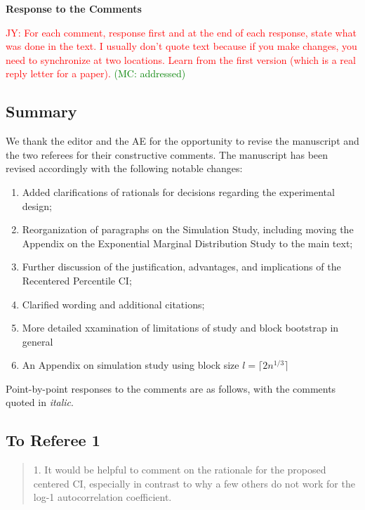 \documentclass[12pt]{article}
\newcommand{\jy}[1]{\textcolor{red}{JY: #1}}
\newcommand{\mc}[1]{\textcolor{green}{(MC: #1)}}
\newenvironment{comment}%
{\begin{quotation}\noindent\small\it\color{darkblue}\ignorespaces%
}{\end{quotation}}
\begin{document}
\begin{center}
  {\Large\bf Response to the Comments}
\end{center}



\jy{For each comment, response first and at the end of each response,
  state what was done in the text. I usually don't quote text because
  if you make changes, you need to synchronize at two locations. Learn
  from the first version (which is a real reply letter for a paper).}
\mc{addressed}

\subsection*{Summary}

We thank the editor and the AE for the opportunity to revise the manuscript and
the two referees for their constructive comments. The manuscript has been
revised accordingly with the following notable changes:
\begin{enumerate}
\item Added clarifications of rationals for decisions regarding the experimental
design;
\item Reorganization of paragraphs on the Simulation Study, including moving the
Appendix on the Exponential Marginal Distribution Study to the main text;
\item Further discussion of the justification, advantages, and implications of
the Recentered Percentile CI;
\item Clarified wording and additional citations;
\item More detailed xxamination of limitations of study and block bootstrap 
in general
\item An Appendix on simulation study using block size 
$l = \lceil 2n^{1/3} \rceil$
\end{enumerate}



Point-by-point responses to the comments are as follows, with the
comments quoted in \emph{\color{darkblue} italic}.

\subsection*{To Referee 1}

\begin{comment}
1. It would be helpful to comment on the rationale for the proposed centered CI, 
especially in contrast to why a few others do not work for the log-1 
autocorrelation coefficient.
\end{comment}
\end{document}
